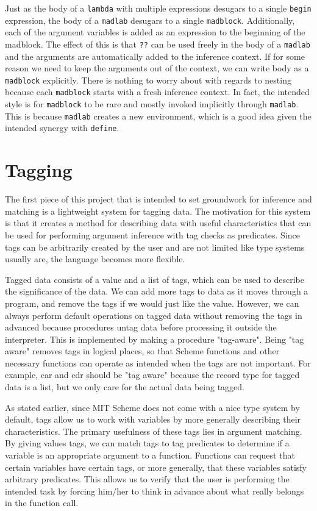 \documentclass[11pt]{article}
\begin{document}
Just as the body of a \texttt{lambda} with multiple expressions
desugars to a single \texttt{begin} expression,
the body of a \texttt{madlab} desugars to a single \texttt{madblock}.
Additionally, each of the argument variables is added as an expression
to the beginning of the madblock.
The effect of this is that \texttt{??}
can be used freely in the body of a \texttt{madlab}
and the arguments are automatically added to the inference context.
If for some reason we need to keep the arguments out of the context,
we can write body as a \texttt{madblock} explicitly.
There is nothing to worry about with regards to nesting
because each \texttt{madblock} starts with a fresh inference context.
In fact, the intended style is for \texttt{madblock} to be rare
and mostly invoked implicitly through \texttt{madlab}.
This is because \texttt{madlab} creates a new environment,
which is a good idea given the intended synergy with \texttt{define}.


\section{Tagging}

The first piece of this project that is intended to set groundwork
for inference and matching is a lightweight system for tagging data.
The motivation for this system is that it creates a method for
describing data with useful characteristics that can be used for
performing argument inference with tag checks as predicates.
Since tags can be arbitrarily created by the user
and are not limited like type systems usually are,
the language becomes more flexible.

Tagged data consists of a value and a list of tags,
which can be used to describe the significance of the data.
We can add more tags to data as it moves through a program,
and remove the tags if we would just like the value.
However, we can always perform default operations on tagged data
without removing the tags in advanced because procedures
untag data before processing it outside the interpreter.
This is implemented by making a procedure "tag-aware".
Being "tag aware" removes tags in logical places,
so that Scheme functions and other necessary functions
can operate as intended when the tags are not important.
For example, car and cdr should be "tag aware" because
the record type for tagged data is a list,
but we only care for the actual data being tagged.

As stated earlier, since MIT Scheme does not come
with a nice type system by default,
tags allow us to work with variables
by more generally describing their characteristics.
The primary usefulness of these tags lies in argument matching.
By giving values tags, we can match tags to tag predicates
to determine if a variable is an appropriate argument to a function.
Functions can request that certain variables have certain tags,
or more generally, that these variables satisfy arbitrary predicates.
This allows us to verify that the user is performing the intended task
by forcing him/her to think in advance about what really belongs
in the function call.
\end{document}
